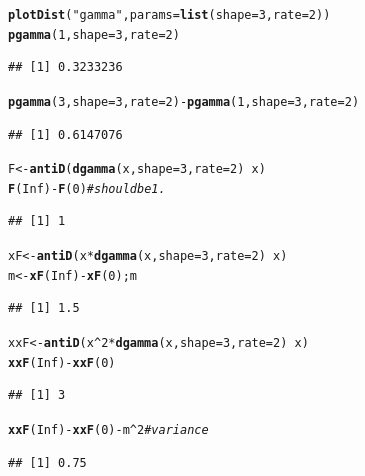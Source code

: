 \documentclass[twoside]{book}\usepackage[]{graphicx}\usepackage[]{xcolor}
\makeatletter
\newcommand{\hlnum}[1]{\textcolor[rgb]{0.686,0.059,0.569}{#1}}%
\newcommand{\hlstr}[1]{\textcolor[rgb]{0.192,0.494,0.8}{#1}}%
\newcommand{\hlcom}[1]{\textcolor[rgb]{0.678,0.584,0.686}{\textit{#1}}}%
\newcommand{\hlopt}[1]{\textcolor[rgb]{0,0,0}{#1}}%
\newcommand{\hlstd}[1]{\textcolor[rgb]{0.345,0.345,0.345}{#1}}%
\newcommand{\hlkwb}[1]{\textcolor[rgb]{0.69,0.353,0.396}{#1}}%
\newcommand{\hlkwc}[1]{\textcolor[rgb]{0.333,0.667,0.333}{#1}}%
\newcommand{\hlkwd}[1]{\textcolor[rgb]{0.737,0.353,0.396}{\textbf{#1}}}%
\newenvironment{kframe}{%
 \def\at@end@of@kframe{}%
 \ifinner\ifhmode%
  \def\at@end@of@kframe{\end{minipage}}%
  \begin{minipage}{\columnwidth}%
 \fi\fi%
 \def\FrameCommand##1{\hskip\@totalleftmargin \hskip-\fboxsep
 \colorbox{shadecolor}{##1}\hskip-\fboxsep
     \hskip-\linewidth \hskip-\@totalleftmargin \hskip\columnwidth}%
 \MakeFramed {\advance\hsize-\width
   \@totalleftmargin\z@ \linewidth\hsize
   \@setminipage}}%
 {\par\unskip\endMakeFramed%
 \at@end@of@kframe}
\newenvironment{knitrout}{}{} %
\makeatother
\begin{document}
\begin{solution}
\begin{knitrout}
\color{fgcolor}\begin{kframe}
\begin{alltt}
\hlkwd{plotDist}\hlstd{(}\hlstr{"gamma"}\hlstd{,} \hlkwc{params}\hlstd{=}\hlkwd{list}\hlstd{(}\hlkwc{shape}\hlstd{=}\hlnum{3}\hlstd{,}\hlkwc{rate}\hlstd{=}\hlnum{2}\hlstd{))}
\hlkwd{pgamma}\hlstd{(}\hlnum{1}\hlstd{,} \hlkwc{shape}\hlstd{=}\hlnum{3}\hlstd{,} \hlkwc{rate}\hlstd{=}\hlnum{2}\hlstd{)}
\end{alltt}
\begin{verbatim}
## [1] 0.3233236
\end{verbatim}
\begin{alltt}
\hlkwd{pgamma}\hlstd{(}\hlnum{3}\hlstd{,} \hlkwc{shape}\hlstd{=}\hlnum{3}\hlstd{,} \hlkwc{rate}\hlstd{=}\hlnum{2}\hlstd{)} \hlopt{-}  \hlkwd{pgamma}\hlstd{(}\hlnum{1}\hlstd{,} \hlkwc{shape}\hlstd{=}\hlnum{3}\hlstd{,} \hlkwc{rate}\hlstd{=}\hlnum{2}\hlstd{)}
\end{alltt}
\begin{verbatim}
## [1] 0.6147076
\end{verbatim}
\begin{alltt}
\hlstd{F} \hlkwb{<-} \hlkwd{antiD}\hlstd{(} \hlkwd{dgamma}\hlstd{(x,} \hlkwc{shape}\hlstd{=}\hlnum{3}\hlstd{,} \hlkwc{rate}\hlstd{=}\hlnum{2}\hlstd{)} \hlopt{~} \hlstd{x )}
\hlkwd{F}\hlstd{(}\hlnum{Inf}\hlstd{)} \hlopt{-} \hlkwd{F}\hlstd{(}\hlnum{0}\hlstd{)}    \hlcom{# should be 1.}
\end{alltt}
\begin{verbatim}
## [1] 1
\end{verbatim}
\begin{alltt}
\hlstd{xF} \hlkwb{<-} \hlkwd{antiD}\hlstd{( x} \hlopt{*} \hlkwd{dgamma}\hlstd{(x,} \hlkwc{shape}\hlstd{=}\hlnum{3}\hlstd{,} \hlkwc{rate}\hlstd{=}\hlnum{2}\hlstd{)} \hlopt{~} \hlstd{x )}
\hlstd{m} \hlkwb{<-} \hlkwd{xF}\hlstd{(}\hlnum{Inf}\hlstd{)} \hlopt{-} \hlkwd{xF}\hlstd{(}\hlnum{0}\hlstd{); m}
\end{alltt}
\begin{verbatim}
## [1] 1.5
\end{verbatim}
\begin{alltt}
\hlstd{xxF} \hlkwb{<-} \hlkwd{antiD}\hlstd{( x}\hlopt{^}\hlnum{2} \hlopt{*} \hlkwd{dgamma}\hlstd{(x,} \hlkwc{shape}\hlstd{=}\hlnum{3}\hlstd{,} \hlkwc{rate}\hlstd{=}\hlnum{2}\hlstd{)} \hlopt{~} \hlstd{x )}
\hlkwd{xxF}\hlstd{(}\hlnum{Inf}\hlstd{)} \hlopt{-} \hlkwd{xxF}\hlstd{(}\hlnum{0}\hlstd{)}
\end{alltt}
\begin{verbatim}
## [1] 3
\end{verbatim}
\begin{alltt}
\hlkwd{xxF}\hlstd{(}\hlnum{Inf}\hlstd{)} \hlopt{-} \hlkwd{xxF}\hlstd{(}\hlnum{0}\hlstd{)} \hlopt{-} \hlstd{m}\hlopt{^}\hlnum{2} \hlcom{# variance}
\end{alltt}
\begin{verbatim}
## [1] 0.75
\end{verbatim}
\end{kframe}


\end{knitrout}
\end{solution}
\end{document}
